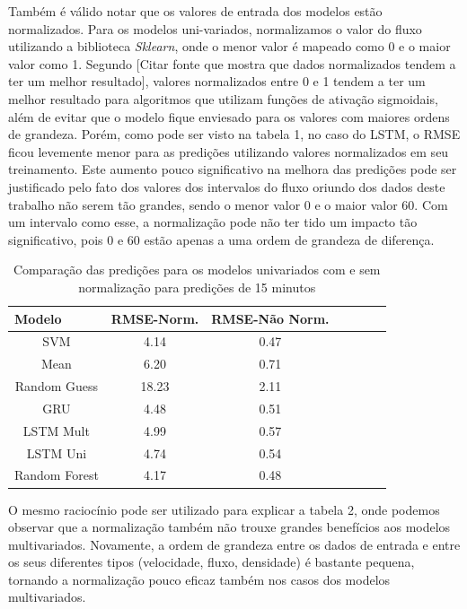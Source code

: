 Também é válido notar que os valores de entrada dos modelos estão normalizados. Para os modelos uni-variados, normalizamos o valor do fluxo utilizando a biblioteca \textit{Sklearn}, onde o menor valor é mapeado como 0 e o maior valor como 1. Segundo [Citar fonte que mostra que dados normalizados tendem a ter um melhor resultado], valores normalizados entre 0 e 1 tendem a ter um melhor resultado para algoritmos que utilizam funções de ativação sigmoidais, além de evitar que o modelo fique enviesado para os valores com maiores ordens de grandeza. Porém, como pode ser visto na tabela 1, no caso do \acrfull{LSTM}, o \acrfull{RMSE} ficou levemente menor para as predições utilizando valores normalizados em seu treinamento. Este aumento pouco significativo na melhora das predições pode ser justificado pelo fato dos valores dos intervalos do fluxo oriundo dos dados deste trabalho não serem tão grandes, sendo o menor valor 0 e o maior valor 60. Com um intervalo como esse, a normalização pode não ter tido um impacto tão significativo, pois 0 e 60 estão apenas a uma ordem de grandeza de diferença.

\begin{table}[H]
    \caption{Comparação das predições para os modelos univariados com e sem normalização para predições de 15 minutos}
    \label{table:RmseComparison}
    \begin{center}
    \begin{tabular}{ccccccc}
    \hline
    \multicolumn{1}{l}{\textbf{Modelo}} & \multicolumn{1}{l}{\textbf{RMSE-Norm.}} & \multicolumn{1}{l}{\textbf{RMSE-Não Norm.}}\\
    \hline
    SVM & 4.14 & 0.47  \\
    Mean & 6.20 & 0.71  \\
    Random Guess & 18.23 & 2.11\\
    GRU & 4.48 & 0.51  \\ 
    LSTM Mult & 4.99 &  0.57  \\ 
    LSTM Uni & 4.74 &  0.54  \\ 
    Random Forest & 4.17 & 0.48 \\
    \hline
    \end{tabular}
    \end{center}
\end{table}


O mesmo raciocínio pode ser utilizado para explicar a tabela 2, onde podemos observar que a normalização também não trouxe grandes benefícios aos modelos multivariados. Novamente, a ordem de grandeza entre os dados de entrada e entre os seus diferentes tipos (velocidade, fluxo, densidade) é bastante pequena, tornando a normalização pouco eficaz também nos casos dos modelos multivariados.

